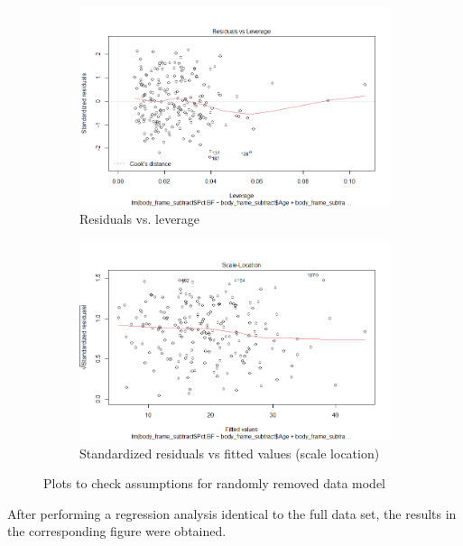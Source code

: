 \documentclass[12pt]{article}
\begin{document}
\begin{figure}
\begin{subfigure}{.45\textwidth}
  \centering
  \includegraphics[width=.8\linewidth]{residvlev3.png}  
  \caption{Residuals vs. leverage}
  \label{fig:sub-third}
\end{subfigure}
\begin{subfigure}{.45\textwidth}
  \centering
  \includegraphics[width=.8\linewidth]{scaleloc3.png}
  
  \caption{Standardized residuals vs fitted values (scale location)}
  \label{fig:sub-fourth}
\end{subfigure}
\caption{Plots to check assumptions for randomly removed data model}
\label{fig:fig}
\end{figure}

After performing a regression analysis identical to the full data set, the results in the corresponding figure were obtained.
\end{document}
